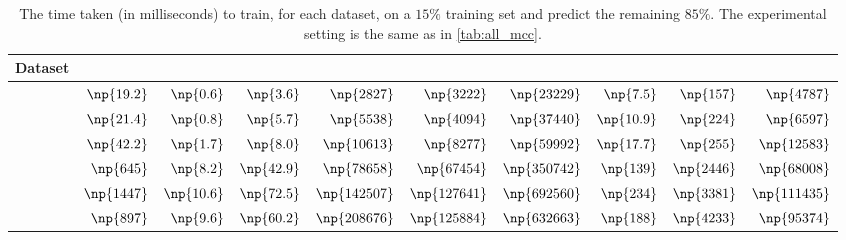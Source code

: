 \begin{table}[htb]
\begin{adjustwidth}{-2cm}{}
  \centering
  \scriptsize
  \caption[Training time on a 15\% training set]{The time taken (in milliseconds) to train, for each dataset, on a $15\%$ training set and
    predict the remaining $85\%$. The experimental setting is the same as in \autoref{tab:all_mcc}.
  \label{tab:all_time}}
  \begin{tabulary}{179mm}{lrrrr|rrrrr}
    \toprule
    Dataset & \uslpropGsec{} & \usrule{}   & \uslogregp{} & \usoptim{}    & \complowrank{} & \compmaxnorm{} & \comptriads{} & \compranknodes{} & \compbayesian{} \\
    \midrule
    \aut{}  & $\np{19.2}$    & $\np{0.6}$  & $\np{3.6}$   & $\np{2827}$   & $\np{3222}$    & $\np{23229}$   & $\np{7.5}$    & $\np{157}$       & $\np{4787}$     \\
    \adv{}  & $\np{21.4}$    & $\np{0.8}$  & $\np{5.7}$   & $\np{5538}$   & $\np{4094}$    & $\np{37440}$   & $\np{10.9}$   & $\np{224}$       & $\np{6597}$     \\
    \wik{}  & $\np{42.2}$    & $\np{1.7}$  & $\np{8.0}$   & $\np{10613}$  & $\np{8277}$    & $\np{59992}$   & $\np{17.7}$   & $\np{255}$       & $\np{12583}$    \\
    \sla{}  & $\np{645}$     & $\np{8.2}$  & $\np{42.9}$  & $\np{78658}$  & $\np{67454}$   & $\np{350742}$  & $\np{139}$    & $\np{2446}$      & $\np{68008}$    \\
    \epi{}  & $\np{1447}$    & $\np{10.6}$ & $\np{72.5}$  & $\np{142507}$ & $\np{127641}$  & $\np{692560}$  & $\np{234}$    & $\np{3381}$      & $\np{111435}$   \\
    \kiw{}  & $\np{897}$     & $\np{9.6}$  & $\np{60.2}$  & $\np{208676}$ & $\np{125884}$  & $\np{632663}$  & $\np{188}$    & $\np{4233}$      & $\np{95374}$    \\
    \bottomrule
  \end{tabulary}
\end{adjustwidth}
\end{table}
